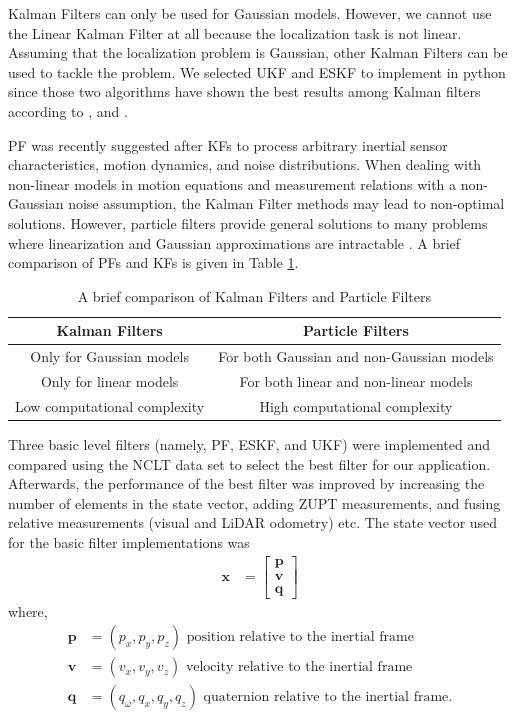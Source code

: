 Kalman Filters can only be used for Gaussian models. However, we cannot use the Linear Kalman Filter at all because the localization task is not linear. Assuming that the localization problem is Gaussian, other Kalman Filters can be used to tackle the problem. We selected  \gls{UKF} and \gls{ESKF} to implement in python since those two algorithms have shown the best results among Kalman filters according to \cite{ch24:st2004comparison},\cite{ch25:madyastha2011extended} and \cite{ch26:wan2000unscented}.

\gls{PF} was recently suggested after \gls{KF}s to process arbitrary inertial sensor characteristics, motion dynamics, and noise distributions. When dealing with non-linear models in motion equations and measurement relations with a non-Gaussian noise assumption, the Kalman Filter methods may lead to non-optimal solutions. However, particle filters provide general solutions to many problems where linearization and Gaussian approximations are intractable \cite{ch27:ababsa2004comparison}. A brief comparison of \gls{PF}s and \gls{KF}s is given in Table \ref{table:ch:KFandPFComparison}.
\begin{table}[h]
\centering
	\begin{tabular}{|c|c|} 
		\hline
		\textbf{Kalman Filters} & \textbf{Particle Filters} \\
		\hline
		Only for Gaussian models & For both Gaussian and non-Gaussian models\\
		\hline
		Only for linear models& For both linear and non-linear models
		\\
		\hline
		Low computational complexity&High computational complexity\\
		\hline
	\end{tabular}
	\caption{A brief comparison of Kalman Filters and Particle Filters}
	\label{table:ch:KFandPFComparison}
\end{table}

Three basic level filters (namely, \gls{PF}, \gls{ESKF}, and \gls{UKF}) were implemented and compared using the \gls{NCLT} data set to select the best filter for our application. Afterwards, the performance of the  best filter was improved by increasing the number of elements in the state vector, adding \gls{ZUPT} measurements, and fusing relative measurements (visual and \gls{LiDAR} odometry) etc. The state vector used for the basic filter implementations was
\begin{align}
\label{eq:ch:basicStateVector}
   \textbf{x} &= \left[\begin{matrix}{}\textbf{p}\\\textbf{v}\\\textbf{q}\end{matrix}\right]
\end{align}
where,
\begin{align}
	\textbf{p}&=(p_x,p_y,p_z) \text{ position relative to the inertial frame}\\
	\textbf{v}&=(v_x,v_y,v_z) \text{ velocity relative to the inertial frame}\\
	\textbf{q}&=(q_\omega,q_x,q_y,q_z) \text{ quaternion relative to the inertial frame}.
\end{align}

